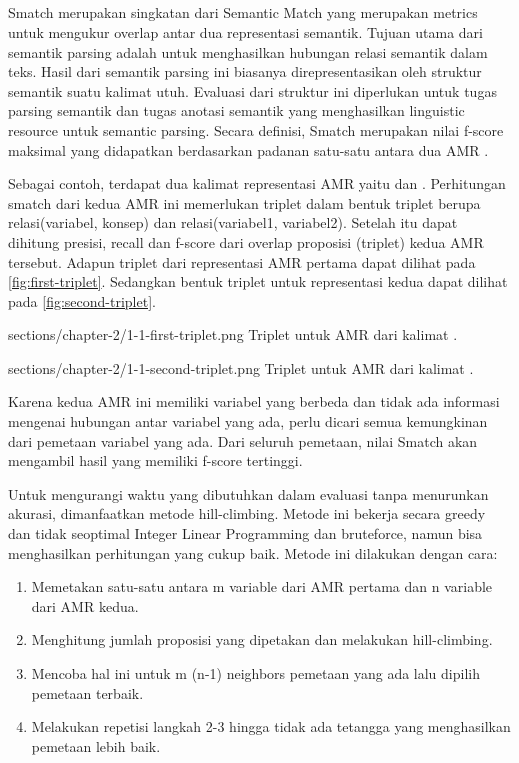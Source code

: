 \subsection{}

Smatch merupakan singkatan dari Semantic Match yang merupakan metrics untuk mengukur overlap antar dua representasi semantik.
Tujuan utama dari semantik parsing adalah untuk menghasilkan hubungan relasi semantik dalam teks.
Hasil dari semantik parsing ini biasanya direpresentasikan oleh struktur semantik suatu kalimat utuh.
Evaluasi dari struktur ini diperlukan untuk tugas parsing semantik dan tugas anotasi semantik yang menghasilkan linguistic resource untuk semantic parsing.
Secara definisi, Smatch merupakan nilai f-score maksimal yang didapatkan berdasarkan padanan satu-satu antara dua AMR .

Sebagai contoh, terdapat dua kalimat representasi AMR yaitu  dan .
Perhitungan smatch dari kedua AMR ini memerlukan triplet dalam bentuk triplet berupa relasi(variabel, konsep) dan relasi(variabel1, variabel2).
Setelah itu dapat dihitung presisi, recall dan f-score dari overlap proposisi (triplet) kedua AMR tersebut.
Adapun triplet dari representasi AMR pertama dapat dilihat pada \cref{fig:first-triplet}.
Sedangkan bentuk triplet untuk representasi kedua dapat dilihat pada \cref{fig:second-triplet}.

  {sections/chapter-2/1-1-first-triplet.png}
  {Triplet untuk AMR dari kalimat .}

  {sections/chapter-2/1-1-second-triplet.png}
  {Triplet untuk AMR dari kalimat .}

Karena kedua AMR ini memiliki variabel yang berbeda dan tidak ada informasi mengenai hubungan antar variabel yang ada, perlu dicari semua kemungkinan dari pemetaan variabel yang ada.
Dari seluruh pemetaan, nilai Smatch akan mengambil hasil yang memiliki f-score tertinggi.

Untuk mengurangi waktu yang dibutuhkan dalam evaluasi tanpa menurunkan akurasi, dimanfaatkan metode hill-climbing.
Metode ini bekerja secara greedy dan tidak seoptimal Integer Linear Programming dan bruteforce, namun bisa menghasilkan perhitungan yang cukup baik.
Metode ini dilakukan dengan cara:
\begin{enumerate}
  \item Memetakan satu-satu antara m variable dari AMR pertama dan n variable dari AMR kedua.
  \item Menghitung jumlah proposisi yang dipetakan dan melakukan hill-climbing.
  \item Mencoba hal ini untuk m (n-1) neighbors pemetaan yang ada lalu dipilih pemetaan terbaik.
  \item Melakukan repetisi langkah 2-3 hingga tidak ada tetangga yang menghasilkan pemetaan lebih baik.
\end{enumerate}

